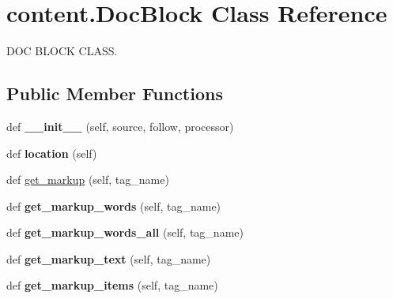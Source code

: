 \hypertarget{classcontent_1_1_doc_block}{}\section{content.\+Doc\+Block Class Reference}
\label{classcontent_1_1_doc_block}


D\+OC B\+L\+O\+CK C\+L\+A\+SS.  


\subsection*{Public Member Functions}
\begin{DoxyCompactItemize}
\item 
\mbox{\label{classcontent_1_1_doc_block_a5e28bc63ef3ca2a983f3803e2edd7c86}} 
def {\bfseries \+\_\+\+\_\+init\+\_\+\+\_\+} (self, source, follow, processor)
\item 
\mbox{\label{classcontent_1_1_doc_block_acfbd583d7b0240158feb1c2a5e8fe43b}} 
def {\bfseries location} (self)
\item 
def \hyperlink{classcontent_1_1_doc_block_a23ba3a31d49b8c270fc1e4fc37be6957}{get\+\_\+markup} (self, tag\+\_\+name)
\item 
\mbox{\label{classcontent_1_1_doc_block_ae717593ff84c39c93db46edba0136289}} 
def {\bfseries get\+\_\+markup\+\_\+words} (self, tag\+\_\+name)
\item 
\mbox{\label{classcontent_1_1_doc_block_adf90076b554f3d3bdff8437b919accff}} 
def {\bfseries get\+\_\+markup\+\_\+words\+\_\+all} (self, tag\+\_\+name)
\item 
\mbox{\label{classcontent_1_1_doc_block_a245543b0497bd77647c40cdb3acbedae}} 
def {\bfseries get\+\_\+markup\+\_\+text} (self, tag\+\_\+name)
\item 
\mbox{\label{classcontent_1_1_doc_block_aba841ae355b4077a60ae7495e8081c27}} 
def {\bfseries get\+\_\+markup\+\_\+items} (self, tag\+\_\+name)
\end{DoxyCompactItemize}
